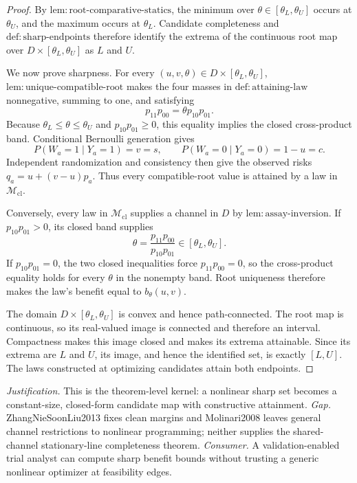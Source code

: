 \documentclass{article}
\begin{document}
\begin{proof}
By \(\mathrm{lem:root\text{-}comparative\text{-}statics}\), the minimum over \(\theta\in[\theta_L,\theta_U]\) occurs at \(\theta_U\), and the maximum occurs at \(\theta_L\). Candidate completeness and \(\mathrm{def:sharp\text{-}endpoints}\) therefore identify the extrema of the continuous root map over \(D\times[\theta_L,\theta_U]\) as \(L\) and \(U\).

We now prove sharpness. For every \((u,v,\theta)\in D\times[\theta_L,\theta_U]\), \(\mathrm{lem:unique\text{-}compatible\text{-}root}\) makes the four masses in \(\mathrm{def:attaining\text{-}law}\) nonnegative, summing to one, and satisfying
\[
p_{11}p_{00}=\theta p_{10}p_{01}.
\]
Because \(\theta_L\leq\theta\leq\theta_U\) and \(p_{10}p_{01}\geq0\), this equality implies the closed cross-product band. Conditional Bernoulli generation gives
\[
P(W_a=1\mid Y_a=1)=v=s,
\qquad
P(W_a=0\mid Y_a=0)=1-u=c.
\]
Independent randomization and consistency then give the observed risks \(q_a=u+(v-u)p_a\). Thus every compatible-root value is attained by a law in \(\mathcal M_{\mathrm{cl}}\).

Conversely, every law in \(\mathcal M_{\mathrm{cl}}\) supplies a channel in \(D\) by \(\mathrm{lem:assay\text{-}inversion}\). If \(p_{10}p_{01}>0\), its closed band supplies
\[
\theta=\frac{p_{11}p_{00}}{p_{10}p_{01}}
\in[\theta_L,\theta_U].
\]
If \(p_{10}p_{01}=0\), the two closed inequalities force \(p_{11}p_{00}=0\), so the cross-product equality holds for every \(\theta\) in the nonempty band. Root uniqueness therefore makes the law's benefit equal to \(b_\theta(u,v)\).

The domain \(D\times[\theta_L,\theta_U]\) is convex and hence path-connected. The root map is continuous, so its real-valued image is connected and therefore an interval. Compactness makes this image closed and makes its extrema attainable. Since its extrema are \(L\) and \(U\), its image, and hence the identified set, is exactly \([L,U]\). The laws constructed at optimizing candidates attain both endpoints.
\end{proof}
\par\smallskip\noindent \textit{Justification.} This is the theorem-level kernel: a nonlinear sharp set becomes a constant-size, closed-form candidate map with constructive attainment. \textit{Gap.} ZhangNieSoonLiu2013 fixes clean margins and Molinari2008 leaves general channel restrictions to nonlinear programming; neither supplies the shared-channel stationary-line completeness theorem. \textit{Consumer.} A validation-enabled trial analyst can compute sharp benefit bounds without trusting a generic nonlinear optimizer at feasibility edges.
\end{document}
